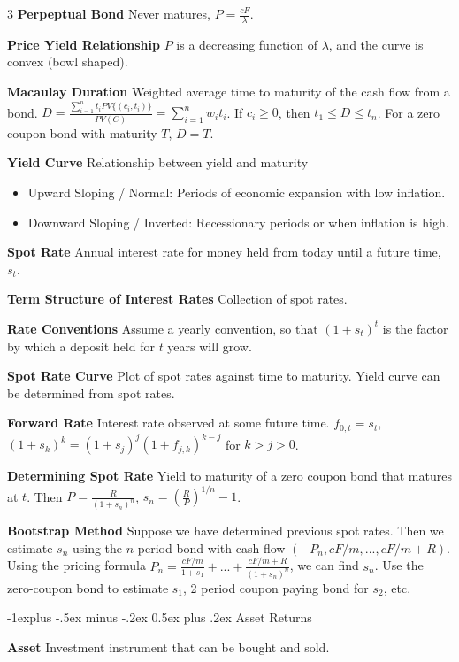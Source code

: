 \documentclass[10pt, landscape]{article}
\makeatletter
\renewcommand{\section}{\@startsection{section}{1}{0mm}%
                                {-1ex plus -.5ex minus -.2ex}%
                                {0.5ex plus .2ex}%
                                {\normalfont\large\bfseries}}
\renewcommand{\section}{\@startsection{section}{2}{0mm}%
                                {-1explus -.5ex minus -.2ex}%
                                {0.5ex plus .2ex}%
                                {\normalfont\normalsize\bfseries}}
\makeatother
\begin{document}
\begin{multicols*}{3}
\textbf{Perpeptual Bond} Never matures, $P=\frac{cF}{\lambda}$.

\textbf{Price Yield Relationship} $P$ is a decreasing function of $\lambda$, and the curve is convex (bowl shaped).

\textbf{Macaulay Duration} Weighted average time to maturity of the cash flow from a bond. $D=\frac{\sum_{i=1}^nt_iPV\{(c_i, t_i)\}}{PV(C)}=\sum_{i=1}^nw_it_i$. If $c_i \geq 0$, then $t_1\leq D \leq t_n$. For a zero coupon bond with maturity $T$, $D=T$.

\textbf{Yield Curve} Relationship between yield and maturity
\begin{itemize}
    \item Upward Sloping / Normal: Periods of economic expansion with low inflation.
    \item Downward Sloping / Inverted: Recessionary periods or when inflation is high.
\end{itemize}

\textbf{Spot Rate} Annual interest rate for money held from today until a future time, $s_t$.

\textbf{Term Structure of Interest Rates} Collection of spot rates.

\textbf{Rate Conventions} Assume a yearly convention, so that $(1+s_t)^t$ is the factor by which a deposit held for $t$ years will grow.

\textbf{Spot Rate Curve} Plot of spot rates against time to maturity. Yield curve can be determined from spot rates.

\textbf{Forward Rate} Interest rate observed at some future time. $f_{0, t}=s_t$, $(1+s_k)^k=(1+s_j)^j(1+f_{j, k})^{k-j}$ for $k>j>0$.

\textbf{Determining Spot Rate} Yield to maturity of a zero coupon bond that matures at $t$. Then $P=\frac{R}{(1+s_n)^n}$, $s_n=(\frac{R}{P})^{1/n}-1$.

\textbf{Bootstrap Method} Suppose we have determined previous spot rates. Then we estimate $s_n$ using the $n$-period bond with cash flow $(-P_n, cF/m,...,cF/m+R)$. Using the pricing formula $P_n=\frac{cF/m}{1+s_1}+...+\frac{cF/m+R}{(1+s_n)^n}$, we can find $s_n$. Use the zero-coupon bond to estimate $s_1$, 2 period coupon paying bond for $s_2$, etc.

\section{Asset Returns}

\textbf{Asset} Investment instrument that can be bought and sold.


\end{multicols*}
\end{document}
